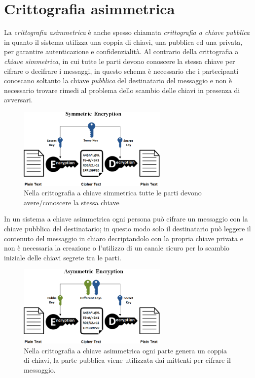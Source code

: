 \section{Crittografia asimmetrica}
La \textit{crittografia asimmetrica} è anche spesso chiamata \textit{crittografia a chiave pubblica} in quanto il sistema utilizza una coppia di chiavi, una pubblica ed una privata, per garantire autenticazione e confidenzialità.
Al contrario della crittografia a \textit{chiave simmetrica}, in cui tutte le parti devono conoscere la stessa chiave per cifrare o decifrare i messaggi, in questo schema è necessario che i partecipanti conoscano soltanto la chiave \textit{pubblica} del destinatario del messaggio e non è necessario trovare rimedi al problema dello scambio delle chiavi in presenza di avversari.
\begin{figure}[H]
    \centering
    \includegraphics[width=0.65\textwidth]{images/simmetric.png}
    \caption{Nella crittografia a chiave simmetrica tutte le parti devono avere/conoscere la stessa chiave}
\end{figure}
In un sistema a chiave asimmetrica ogni persona può cifrare un messaggio con la chiave pubblica del destinatario; in questo modo solo il destinatario può leggere il contenuto del messaggio in chiaro decriptandolo con la propria chiave privata e non è necessaria la creazione o l'utilizzo di un canale sicuro per lo scambio iniziale delle chiavi segrete tra le parti.
\begin{figure}
    \centering
    \includegraphics[width=0.65\textwidth]{images/asymmetric.png}
    \caption{Nella crittografia a chiave asimmetrica ogni parte genera un coppia di chiavi, la parte pubblica viene utilizzata dai mittenti per cifrare il messaggio.}
\end{figure}
